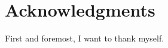 
\chapter*{Acknowledgments}
\thispagestyle{empty}

First and foremost, I want to thank myself. 

\clearpage